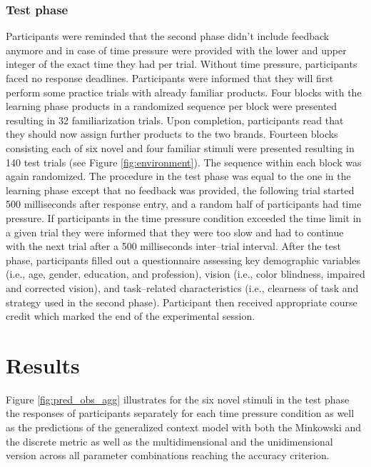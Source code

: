 \documentclass[a4paper,man,natbib]{apa6}
\begin{document}
\subsubsection{Test phase}
Participants were reminded that the second phase didn't include feedback anymore and in case of time pressure were provided with the lower and upper integer of the exact time they had per trial. Without time pressure, participants faced no response deadlines. Participants were informed that they will first perform some practice trials with already familiar products. Four blocks with the learning phase products in a randomized sequence per block were presented resulting in 32 familiarization trials. Upon completion, participants read that they should now assign further products to the two brands. Fourteen blocks consisting each of six novel and four familiar stimuli were presented resulting in 140 test trials (see Figure \ref{fig:environment}). The sequence within each block was again randomized. The procedure in the test phase was equal to the one in the learning phase except that no feedback was provided, the following trial started 500 milliseconds after response entry, and a random half of participants had time pressure. If participants in the time pressure condition exceeded the time limit in a given trial they were informed that they were too slow and had to continue with the next trial after a 500 milliseconds inter--trial interval. After the test phase, participants filled out a questionnaire assessing key demographic variables (i.e., age, gender, education, and profession), vision (i.e., color blindness, impaired and corrected vision), and task--related characteristics (i.e., clearness of task and strategy used in the second phase). Participant then received appropriate course credit which marked the end of the experimental session.

\section{Results}
Figure \ref{fig:pred_obs_agg} illustrates for the six novel stimuli in the test phase the responses of participants separately for each time pressure condition as well as the predictions of the generalized context model with both the Minkowski and the discrete metric as well as the multidimensional and the unidimensional version across all parameter combinations reaching the accuracy criterion.
\end{document}
